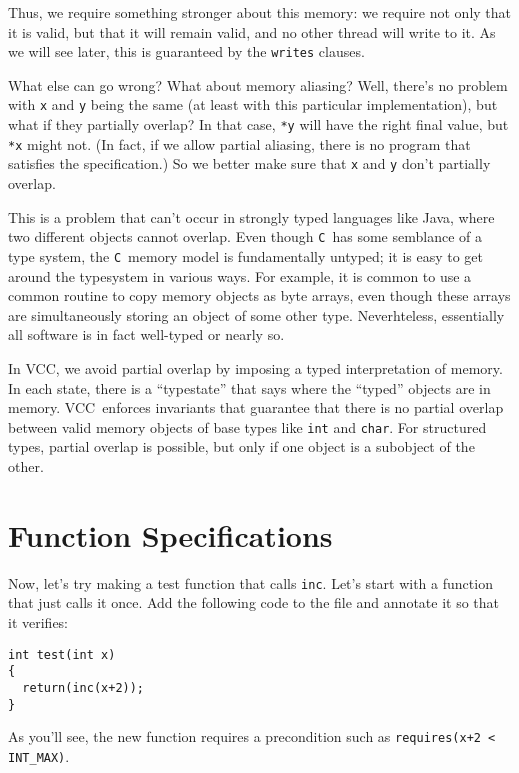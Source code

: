 \documentclass{report}
\newcommand{\Q}[1]{\lstinline~#1~}
\newcommand{\C}{\Q{C}}
\newcommand{\VCC}{VCC}
\begin{document}
Thus, we require something stronger about this memory: we require not
only that it is valid, but that it will remain valid, and no other
thread will write to it. As we will see later, this is guaranteed by the 
\Q{writes} clauses. 

What else can go wrong? What about memory aliasing? Well, there's no
problem with \Q{x} and \Q{y} being the same (at least with this
particular implementation), but what if they partially overlap? In
that case, \Q{*y} will have the right final value, but \Q{*x} might
not. (In fact, if we allow partial aliasing, there is no program that
satisfies the specification.) So we better make sure that \Q{x} and
\Q{y} don't partially overlap.

This is a problem that can't occur in strongly typed languages like
Java, where two different objects cannot overlap.  
Even though \C\ has some semblance of a type system, the \C\ memory
model is fundamentally untyped; it is easy to get around the
typesystem in various ways.  For example, it is common to use a common
routine to copy memory objects as byte arrays, even though these
arrays are simultaneously storing an object of some other type.
Neverhteless, essentially all software is in fact well-typed or nearly
so. 

In \VCC, we avoid partial overlap by imposing a typed interpretation
of memory.  In each state, there is a ``typestate'' that says where
the ``typed'' objects are in memory. \VCC\ enforces invariants that
guarantee that there is no partial overlap between valid memory
objects of base types like \Q{int} and \Q{char}. For structured types,
partial overlap is possible, but only if one object is a subobject of
the other.


\chapter{Function Specifications}

Now, let's try making a test function that calls \Q{inc}. Let's start with
a function that just calls it once. Add the following code to the file
and annotate it so that it verifies:
\begin{lstlisting}
int test(int x)
{
  return(inc(x+2));
}
\end{lstlisting}
As you'll see, the new function requires a precondition such as
\Q{requires(x+2 < INT_MAX)}.
\end{document}
